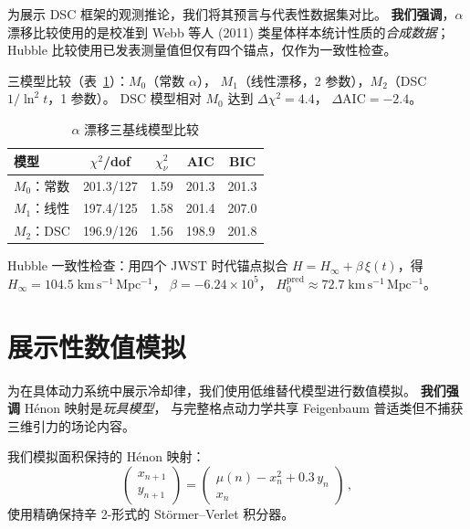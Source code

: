 \documentclass[a4paper,11pt]{article}
\theoremstyle{plain}
\newcommand{\lnq}{\ln^2}
\newcommand{\Hinf}{H_{\infty}}
\begin{document}
为展示 DSC 框架的观测推论，我们将其预言与代表性数据集对比。
\textbf{我们强调}，$\alpha$ 漂移比较使用的是校准到
Webb 等人 (2011) 类星体样本统计性质的\emph{合成数据}；
Hubble 比较使用已发表测量值但仅有四个锚点，仅作为一致性检查。

三模型比较（表~\ref{tab:alpha}）：$M_0$（常数 $\alpha$），
$M_1$（线性漂移，2 参数），$M_2$（DSC $1/\lnq t$，1 参数）。
DSC 模型相对 $M_0$ 达到 $\Delta\chi^2 = 4.4$，
$\Delta\mathrm{AIC} = -2.4$。

\begin{table}[h]
\centering
\caption{$\alpha$ 漂移三基线模型比较}
\label{tab:alpha}
\begin{tabular}{lcccc}
\toprule
模型 & $\chi^2$/dof & $\chi^2_\nu$ & AIC & BIC \\
\midrule
$M_0$：常数 & 201.3/127 & 1.59 & 201.3 & 201.3 \\
$M_1$：线性 & 197.4/125 & 1.58 & 201.4 & 207.0 \\
$M_2$：DSC & 196.9/126 & 1.56 & 198.9 & 201.8 \\
\bottomrule
\end{tabular}
\end{table}

Hubble 一致性检查：用四个 JWST 时代锚点拟合
$H = \Hinf + \beta\,\xi(t)$，得
$\Hinf = 104.5\;\mathrm{km\,s^{-1}\,Mpc^{-1}}$，
$\beta = -6.24 \times 10^5$，
$H_0^{\mathrm{pred}} \approx 72.7\;\mathrm{km\,s^{-1}\,Mpc^{-1}}$。

\section{展示性数值模拟}\label{sec:simulation}

为在具体动力系统中展示冷却律，我们使用低维替代模型进行数值模拟。
\textbf{我们强调} H\'enon 映射是\emph{玩具模型}，
与完整格点动力学共享 Feigenbaum 普适类但不捕获三维引力的场论内容。

我们模拟面积保持的 H\'enon 映射：
\begin{equation}
  \begin{pmatrix} x_{n+1} \\ y_{n+1} \end{pmatrix}
  = \begin{pmatrix} \mu(n) - x_n^2 + 0.3\,y_n \\ x_n \end{pmatrix}\,,
\end{equation}
使用精确保持辛 2-形式的 St\"ormer--Verlet 积分器。
\end{document}
